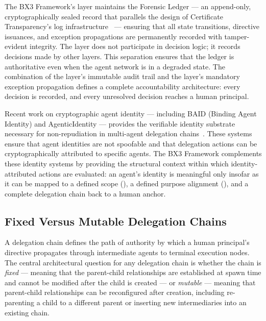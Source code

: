 The BX3 Framework's \fact{} layer maintains the Forensic Ledger — an append-only, cryptographically sealed record that parallels the design of Certificate Transparency's log infrastructure~\cite{certificate-transparency} — ensuring that all state transitions, directive issuances, and exception propagations are permanently recorded with tamper-evident integrity. The \fact{} layer does not participate in decision logic; it records decisions made by other layers. This separation ensures that the ledger is authoritative even when the agent network is in a degraded state. The combination of the \fact{} layer's immutable audit trail and the \bounds{} layer's mandatory exception propagation defines a complete accountability architecture: every decision is recorded, and every unresolved decision reaches a human principal.

Recent work on cryptographic agent identity — including BAID (Binding Agent Identity) and AgenticIdentity — provides the verifiable identity substrate necessary for non-repudiation in multi-agent delegation chains~\cite{baid2025,agenticidentity2025}. These systems ensure that agent identities are not spoofable and that delegation actions can be cryptographically attributed to specific agents. The BX3 Framework complements these identity systems by providing the structural context within which identity-attributed actions are evaluated: an agent's identity is meaningful only insofar as it can be mapped to a defined scope (\bounds{}), a defined purpose alignment (\purpose{}), and a complete delegation chain back to a human anchor.

\subsection{Fixed Versus Mutable Delegation Chains}
\label{sec:delegation}

A delegation chain defines the path of authority by which a human principal's directive propagates through intermediate agents to terminal execution nodes. The central architectural question for any delegation chain is whether the chain is \emph{fixed} — meaning that the parent-child relationships are established at spawn time and cannot be modified after the child is created — or \emph{mutable} — meaning that parent-child relationships can be reconfigured after creation, including re-parenting a child to a different parent or inserting new intermediaries into an existing chain.

